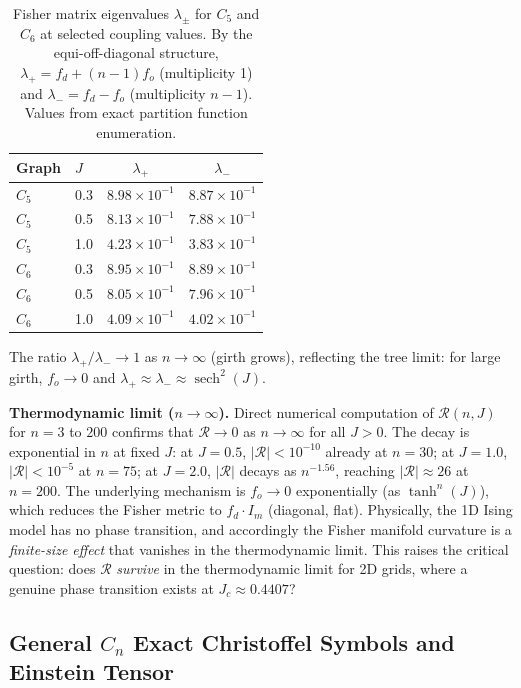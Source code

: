 \documentclass[11pt]{article}
\theoremstyle{definition}
\theoremstyle{remark}
\newcommand{\sech}{\operatorname{sech}}
\newcommand{\Scal}{\mathcal{R}}
\begin{document}
\begin{table}[ht]
\centering
\caption{Fisher matrix eigenvalues $\lambda_\pm$ for $C_5$ and $C_6$
at selected coupling values. By the equi-off-diagonal structure,
$\lambda_+ = f_d + (n-1)f_o$ (multiplicity 1) and
$\lambda_- = f_d - f_o$ (multiplicity $n-1$). Values from
exact partition function enumeration.}
\label{tab:c5-c6-eigs}
\renewcommand{\arraystretch}{1.3}
\begin{tabular}{llcc}
\toprule
Graph & $J$ & $\lambda_+$ & $\lambda_-$ \\
\midrule
$C_5$ & 0.3 & $8.98 \times 10^{-1}$ & $8.87 \times 10^{-1}$ \\
$C_5$ & 0.5 & $8.13 \times 10^{-1}$ & $7.88 \times 10^{-1}$ \\
$C_5$ & 1.0 & $4.23 \times 10^{-1}$ & $3.83 \times 10^{-1}$ \\
$C_6$ & 0.3 & $8.95 \times 10^{-1}$ & $8.89 \times 10^{-1}$ \\
$C_6$ & 0.5 & $8.05 \times 10^{-1}$ & $7.96 \times 10^{-1}$ \\
$C_6$ & 1.0 & $4.09 \times 10^{-1}$ & $4.02 \times 10^{-1}$ \\
\bottomrule
\end{tabular}
\end{table}

The ratio $\lambda_+/\lambda_- \to 1$ as $n \to \infty$ (girth grows),
reflecting the tree limit: for large girth, $f_o \to 0$ and
$\lambda_+ \approx \lambda_- \approx \sech^2(J)$.

\textbf{Thermodynamic limit ($n \to \infty$).}
Direct numerical computation of $\Scal(n, J)$ for $n = 3$ to $200$
confirms that $\Scal \to 0$ as $n \to \infty$ for all $J > 0$.
The decay is exponential in $n$ at fixed $J$: at $J = 0.5$,
$|\Scal| < 10^{-10}$ already at $n = 30$; at $J = 1.0$,
$|\Scal| < 10^{-5}$ at $n = 75$; at $J = 2.0$, $|\Scal|$ decays
as $n^{-1.56}$, reaching $|\Scal| \approx 26$ at $n = 200$.
The underlying mechanism is $f_o \to 0$ exponentially (as $\tanh^n(J)$),
which reduces the Fisher metric to $f_d \cdot I_m$ (diagonal, flat).
Physically, the 1D Ising model has no phase transition, and accordingly
the Fisher manifold curvature is a \emph{finite-size effect} that vanishes
in the thermodynamic limit. This raises the critical question: does $\Scal$
\emph{survive} in the thermodynamic limit for 2D grids, where a genuine
phase transition exists at $J_c \approx 0.4407$?

\subsection{General $C_n$ Exact Christoffel Symbols and Einstein Tensor}
\label{app:cn-exact}
\end{document}
